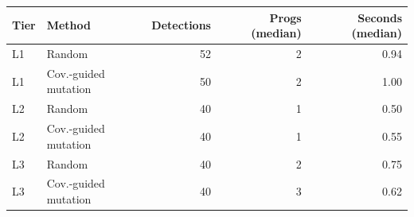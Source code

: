 \begin{tabular}{@{}l l r r r@{}}\toprule
Tier & Method & Detections & Progs (median) & Seconds (median)\\\midrule
L1 & Random & 52 & 2 & 0.94\\
L1 & Cov.-guided mutation & 50 & 2 & 1.00\\
L2 & Random & 40 & 1 & 0.50\\
L2 & Cov.-guided mutation & 40 & 1 & 0.55\\
L3 & Random & 40 & 2 & 0.75\\
L3 & Cov.-guided mutation & 40 & 3 & 0.62\\
\bottomrule\end{tabular}